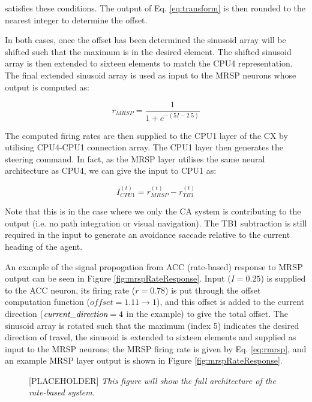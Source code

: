 \documentclass[a4paper,11pt,twoside,openright]{article}
\begin{document}
satisfies these conditions. The output of Eq. \ref{eq:transform} is
then rounded to the nearest integer to determine the offset.  \newline\par

In both cases, once the offset has been determined the sinusoid array
will be shifted such that the maximum is in the desired element. The
shifted sinusoid array is then extended to sixteen elements to match
the CPU4 representation. The final extended sinusoid array is used as
input to the MRSP neurons whose output is computed as:

\begin{equation}
  \label{eq:rmrsp}
  r_{MRSP} = \frac{1}{1 + e^{-(5I - 2.5)}}
\end{equation}

The computed firing rates are then supplied to the CPU1 layer of the
CX by utilising CPU4-CPU1 connection array. The CPU1 layer then
generates the steering command. In fact, as the MRSP layer utilises
the same neural architecture as CPU4, we can give the input to CPU1
as:

\begin{equation}
I_{CPU1}^{(t)} = r_{MRSP}^{(t)} - r_{TB1}^{(t)}
\end{equation}

Note that this is in the case where we only the CA system is
contributing to the output (i.e. no path integration or visual
navigation). The TB1 subtraction is still required in the input to
generate an avoidance saccade relative to the current heading of the
agent.
\newline\par

An example of the signal propogation from ACC (rate-based) response to
MRSP output can be seen in Figure \ref{fig:mrspRateResponse}. Input
($I=0.25$) is supplied to the ACC neuron, its firing rate ($r=0.78$)
is put through the offset computation function ($\textit{offset} =
1.11 \rightarrow 1$), and this offset is added to the current
direction ($\textit{current\textunderscore direction} = 4$ in the
example) to give the total offset. The sinusoid array is rotated such
that the maximum (index 5) indicates the desired direction of travel,
the sinusoid is extended to sixteen elements and supplied as input to
the MRSP neurons; the MRSP firing rate is given by Eq. \ref{eq:rmrsp},
and an example MRSP layer output is shown in Figure
\ref{fig:mrspRateResponse}.

\begin{figure}[h!]
  \caption{\label{fig:mrspRateArrangement}[PLACEHOLDER] \textit{This
      figure will show the full architecture of the rate-based system.}}
\end{figure}
\end{document}

